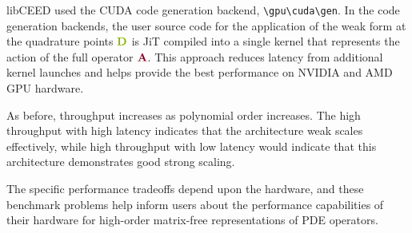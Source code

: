 libCEED used the CUDA code generation backend, \lstinline{\gpu\cuda\gen}.
In the code generation backends, the user source code for the application of the weak form at the quadrature points ${\color{applegreen}\mathbf{D}}$ is JiT compiled into a single kernel that represents the action of the full operator ${\color{burgundy}\mathbf{A}}$.
This approach reduces latency from additional kernel launches and helps provide the best performance on NVIDIA and AMD GPU hardware.

As before, throughput increases as polynomial order increases.
The high throughput with high latency indicates that the architecture weak scales effectively, while high throughput with low latency would indicate that this architecture demonstrates good strong scaling.

The specific performance tradeoffs depend upon the hardware, and these benchmark problems help inform users about the performance capabilities of their hardware for high-order matrix-free representations of PDE operators.